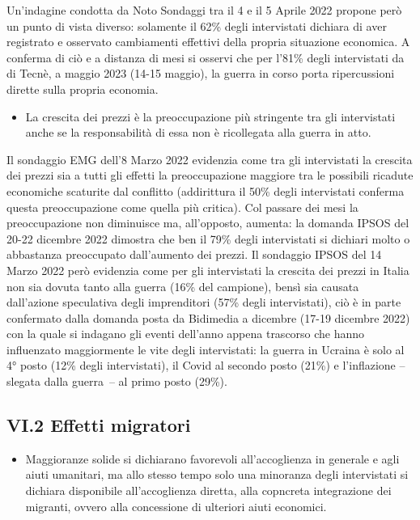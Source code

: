 \documentclass[
  openany]{book}
\providecommand{\tightlist}{%
  \setlength{\itemsep}{0pt}\setlength{\parskip}{0pt}}
\begin{document}
Un'indagine condotta da Noto Sondaggi tra il 4 e il 5 Aprile 2022 propone però un punto di vista diverso: solamente il 62\% degli intervistati dichiara di aver registrato e osservato cambiamenti effettivi della propria situazione economica. A conferma di ciò e a distanza di mesi si osservi che per l'81\% degli intervistati da di Tecnè, a maggio 2023 (14-15 maggio), la guerra in corso porta ripercussioni dirette sulla propria economia.

\begin{itemize}
\tightlist
\item
  La crescita dei prezzi è la preoccupazione più stringente tra gli intervistati anche se la responsabilità di essa non è ricollegata alla guerra in atto.
\end{itemize}

Il sondaggio EMG dell'8 Marzo 2022 evidenzia come tra gli intervistati la crescita dei prezzi sia a tutti gli effetti la preoccupazione maggiore tra le possibili ricadute economiche scaturite dal conflitto (addirittura il 50\% degli intervistati conferma questa preoccupazione come quella più critica). Col passare dei mesi la preoccupazione non diminuisce ma, all'opposto, aumenta: la domanda IPSOS del 20-22 dicembre 2022 dimostra che ben il 79\% degli intervistati si dichiari molto o abbastanza preoccupato dall'aumento dei prezzi. Il sondaggio IPSOS del 14 Marzo 2022 però evidenzia come per gli intervistati la crescita dei prezzi in Italia non sia dovuta tanto alla guerra (16\% del campione), bensì sia causata dall'azione speculativa degli imprenditori (57\% degli intervistati), ciò è in parte confermato dalla domanda posta da Bidimedia a dicembre (17-19 dicembre 2022) con la quale si indagano gli eventi dell'anno appena trascorso che hanno influenzato maggiormente le vite degli intervistati: la guerra in Ucraina è solo al 4° posto (12\% degli intervistati), il Covid al secondo posto (21\%) e l'inflazione -- slegata dalla guerra~-- al primo posto (29\%).

\hypertarget{vi.2-effetti-migratori}{%
\subsection{VI.2 Effetti migratori}\label{vi.2-effetti-migratori}}

\begin{itemize}
\tightlist
\item
  Maggioranze solide si dichiarano favorevoli all'accoglienza in generale e agli aiuti umanitari, ma allo stesso tempo solo una minoranza degli intervistati si dichiara disponibile all'accoglienza diretta, alla copncreta integrazione dei migranti, ovvero alla concessione di ulteriori aiuti economici.
\end{itemize}
\end{document}
